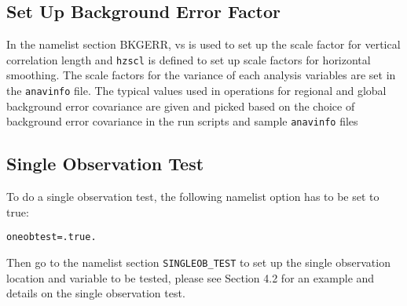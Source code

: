 \subsection{Set Up Background Error Factor}

In the namelist section BKGERR, vs is used to set up the scale factor for vertical correlation length and \verb|hzscl| is defined to set up scale factors for horizontal smoothing. The scale factors for the variance of each analysis variables are set in the \verb|anavinfo| file. The typical values used in operations for regional and global background error covariance are given and picked based on the choice of background error covariance in the run scripts and sample \verb|anavinfo| files

\subsection{Single Observation Test}

To do a single observation test, the following namelist option has to be set to true:

\begin{small}
\begin{verbatim}
oneobtest=.true.
\end{verbatim}
\end{small}

Then go to the namelist section \verb|SINGLEOB_TEST| to set up the single observation location and variable to be tested, please see Section 4.2 for an example and details on the single observation test.
